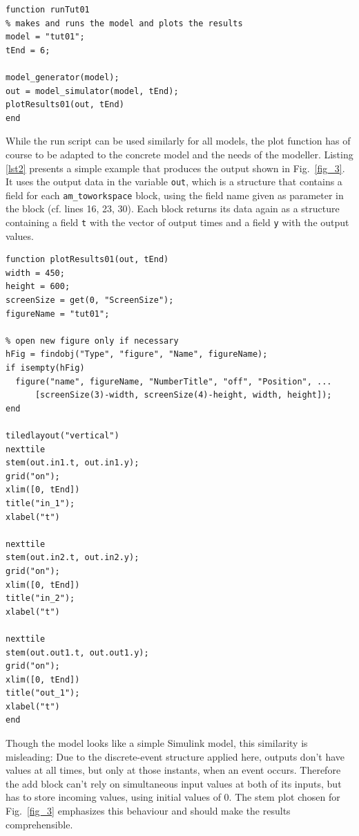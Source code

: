 \documentclass[12pt,oneside,a4paper,bibtotoc,BCOR=0pt,DIV=20]{scrreprt}
\newcommand{\cft}[1]{\mbox{\texttt{#1}}}   %
\begin{document}
\begin{lstlisting}[caption={Run script for example model \cft{tut01}.},captionpos=b,label=lst1]
function runTut01
% makes and runs the model and plots the results
model = "tut01";
tEnd = 6;

model_generator(model);
out = model_simulator(model, tEnd);
plotResults01(out, tEnd)
end
\end{lstlisting}

While the run script can be used similarly for all models, the plot function
has of course to be adapted to the concrete model and the needs of the
modeller. Listing \ref{lst2} presents a simple example that produces the output
shown in Fig.\ \ref{fig_3}. It uses the output data in the variable \cft{out},
which is a structure that contains a field for each \cft{am\_toworkspace}
block, using the field name given as parameter in the block (cf. lines 16, 23,
30). Each block returns its data again as a structure containing a field
\cft{t} with the vector of output times and a field \cft{y} with the output
values.

\begin{lstlisting}[caption={Plot function for example model \cft{tut01}.},captionpos=b,label=lst2]
function plotResults01(out, tEnd)
width = 450;
height = 600;
screenSize = get(0, "ScreenSize");
figureName = "tut01";

% open new figure only if necessary
hFig = findobj("Type", "figure", "Name", figureName);
if isempty(hFig)
  figure("name", figureName, "NumberTitle", "off", "Position", ...
      [screenSize(3)-width, screenSize(4)-height, width, height]);
end

tiledlayout("vertical")
nexttile
stem(out.in1.t, out.in1.y);
grid("on");
xlim([0, tEnd])
title("in_1");
xlabel("t")

nexttile
stem(out.in2.t, out.in2.y);
grid("on");
xlim([0, tEnd])
title("in_2");
xlabel("t")

nexttile
stem(out.out1.t, out.out1.y);
grid("on");
xlim([0, tEnd])
title("out_1");
xlabel("t")
end
\end{lstlisting}

Though the model looks like a simple Simulink model, this similarity is
misleading: Due to the discrete-event structure applied here, outputs don't
have values at all times, but only at those instants, when an event occurs.
Therefore the add block can't rely on simultaneous input values at both of its
inputs, but has to store incoming values, using initial values of $0$. The stem
plot chosen for Fig.\ \ref{fig_3} emphasizes this behaviour and should make the
results comprehensible.
\end{document}
